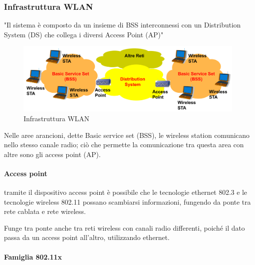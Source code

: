 \subsubsection{Infrastruttura WLAN}

"Il sistema è composto da un insieme di BSS interconnessi con un
Distribution System (DS) che collega i diversi Access Point (AP)"


\begin{figure}[h!]
    \centering
    \includegraphics[scale=0.2]{images/infrastrutturawlan.png}
    \caption{Infrastruttura WLAN}
    \label{fig:infrastrutturawlan}
\end{figure}
Nelle aree arancioni, dette Basic service set (BSS), le wireless station comunicano nello stesso canale radio; ciò che permette la comunicazione tra questa area con altre sono gli access point (AP). 

\paragraph{Access point} tramite il dispositivo access point è possibile che le tecnologie ethernet 802.3 e le tecnologie wireless 802.11 possano scambiarsi informazioni, fungendo da ponte tra rete cablata e rete wireless.

Funge tra ponte anche tra reti wireless con canali radio differenti, poiché il dato passa da un access point all'altro, utilizzando ethernet.

\newpage

\paragraph{Famiglia 802.11x}

